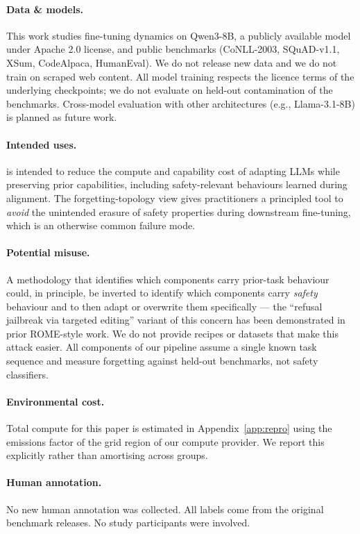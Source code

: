 \paragraph{Data \& models.} This work studies fine-tuning dynamics on Qwen3-8B, a publicly available model under Apache 2.0 license, and public benchmarks (CoNLL-2003, SQuAD-v1.1, XSum, CodeAlpaca, HumanEval). We do not release new data and we do not train on scraped web content. All model training respects the licence terms of the underlying checkpoints; we do not evaluate on held-out contamination of the benchmarks. Cross-model evaluation with other architectures (e.g., Llama-3.1-8B) is planned as future work.

\paragraph{Intended uses.} \tglora{} is intended to reduce the compute and capability cost of adapting LLMs while preserving prior capabilities, including safety-relevant behaviours learned during alignment. The forgetting-topology view gives practitioners a principled tool to \textit{avoid} the unintended erasure of safety properties during downstream fine-tuning, which is an otherwise common failure mode.

\paragraph{Potential misuse.} A methodology that identifies which components carry prior-task behaviour could, in principle, be inverted to identify which components carry \textit{safety} behaviour and to then adapt or overwrite them specifically --- the ``refusal jailbreak via targeted editing'' variant of this concern has been demonstrated in prior ROME-style work. We do not provide recipes or datasets that make this attack easier. All components of our pipeline assume a single known task sequence and measure forgetting against held-out benchmarks, not safety classifiers.

\paragraph{Environmental cost.} Total compute for this paper is estimated in Appendix~\ref{app:repro} using the emissions factor of the grid region of our compute provider. We report this explicitly rather than amortising across groups.

\paragraph{Human annotation.} No new human annotation was collected. All labels come from the original benchmark releases. No study participants were involved.
